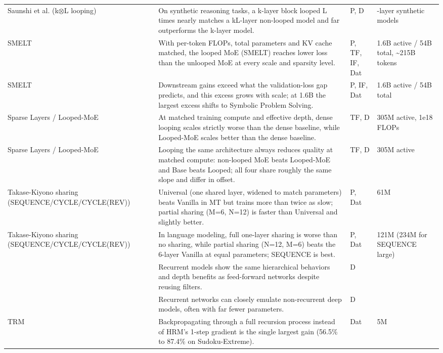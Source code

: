 \begin{longtable}{@{}>{\raggedright\arraybackslash}p{2.7cm}>{\raggedright\arraybackslash}p{7.9cm}>{\raggedright\arraybackslash}p{1.3cm}>{\raggedright\arraybackslash}p{2.5cm}@{}}
Saunshi et al. (k$\otimes$L looping)~\citep{ax2502.17416} & On synthetic reasoning tasks, a k-layer block looped L times nearly matches a kL-layer non-looped model and far outperforms the k-layer model. & P, D & 12-layer synthetic models \\
SMELT~\citep{ax2609.01343} & With per-token FLOPs, total parameters and KV cache matched, the looped MoE (SMELT) reaches lower loss than the unlooped MoE at every scale and sparsity level. & P, TF, IF, Dat & 1.6B active / 54B total, \textasciitilde{}215B tokens \\
SMELT~\citep{ax2609.01343} & Downstream gains exceed what the validation-loss gap predicts, and this excess grows with scale; at 1.6B the largest excess shifts to Symbolic Problem Solving. & P, IF, Dat & 1.6B active / 54B total \\
Sparse Layers /\allowbreak{} Looped-MoE~\citep{ax2605.09165} & At matched training compute and effective depth, dense looping scales strictly worse than the dense baseline, while Looped-MoE scales better than the dense baseline. & TF, D & 305M active, 1e18 FLOPs \\
Sparse Layers /\allowbreak{} Looped-MoE~\citep{ax2605.09165} & Looping the same architecture always reduces quality at matched compute: non-looped MoE beats Looped-MoE and Base beats Looped; all four share roughly the same slope and differ in offset. & TF, D & 305M active \\
Takase-Kiyono sharing (SEQUENCE/\allowbreak{}CYCLE/\allowbreak{}CYCLE(REV))~\citep{ax2104.06022} & Universal (one shared layer, widened to match parameters) beats Vanilla in MT but trains more than twice as slow; partial sharing (M=6, N=12) is faster than Universal and slightly better. & P, Dat & 61M \\
Takase-Kiyono sharing (SEQUENCE/\allowbreak{}CYCLE/\allowbreak{}CYCLE(REV))~\citep{ax2104.06022} & In language modeling, full one-layer sharing is worse than no sharing, while partial sharing (N=12, M=6) beats the 6-layer Vanilla at equal parameters; SEQUENCE is best. & P, Dat & 121M (234M for SEQUENCE large) \\
\citep{ax2102.11011} & Recurrent models show the same hierarchical behaviors and depth benefits as feed-forward networks despite reusing filters. & D &  \\
\citep{ax2102.11011} & Recurrent networks can closely emulate non-recurrent deep models, often with far fewer parameters. & D &  \\
TRM~\citep{ax2510.04871} & Backpropagating through a full recursion process instead of HRM's 1-step gradient is the single largest gain (56.5\% to 87.4\% on Sudoku-Extreme). & Dat & 5M \\

\end{longtable}
